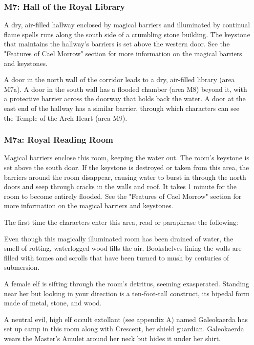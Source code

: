\documentclass[10pt,a4paper,twoside,bg=print,twocolumn,openany,nodeprecatedcode]{dndbook}
\begin{document}
\subsubsection{M7: Hall of the Royal Library}
A dry, air-filled hallway enclosed by magical barriers and illuminated by continual flame spells runs along the south side of a crumbling stone building. The keystone that maintains the hallway's barriers is set above the western door. See the "Features of Cael Morrow" section for more information on the magical barriers and keystones.

A door in the north wall of the corridor leads to a dry, air-filled library (area M7a). A door in the south wall has a flooded chamber (area M8) beyond it, with a protective barrier across the doorway that holds back the water. A door at the east end of the hallway has a similar barrier, through which characters can see the Temple of the Arch Heart (area M9).

\subsubsection{M7a: Royal Reading Room}
Magical barriers enclose this room, keeping the water out. The room's keystone is set above the south door. If the keystone is destroyed or taken from this area, the barriers around the room disappear, causing water to burst in through the north doors and seep through cracks in the walls and roof. It takes 1 minute for the room to become entirely flooded. See the "Features of Cael Morrow" section for more information on the magical barriers and keystones.

The first time the characters enter this area, read or paraphrase the following:

\begin{DndReadAloud}{}
Even though this magically illuminated room has been drained of water, the smell of rotting, waterlogged wood fills the air. Bookshelves lining the walls are filled with tomes and scrolls that have been turned to mush by centuries of submersion.

A female elf is sifting through the room's detritus, seeming exasperated. Standing near her but looking in your direction is a ten-foot-tall construct, its bipedal form made of metal, stone, and wood.

\end{DndReadAloud}

A neutral evil, high elf occult extollant (see appendix A) named Galeokaerda has set up camp in this room along with Crescent, her shield guardian. Galeokaerda wears the Master's Amulet around her neck but hides it under her shirt.
\end{document}
